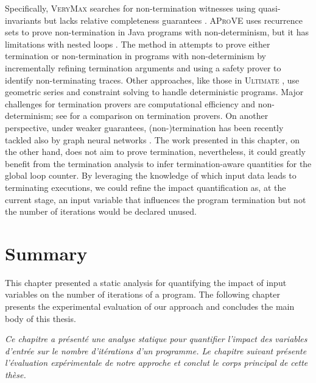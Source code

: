 Specifically, \textsc{VeryMax} \cite{Borralleras2017} searches for non-termination witnesses using quasi-invariants but lacks relative completeness guarantees \cite{Larraz2013}.
\textsc{AProVE} \cite{Giesl2017} uses recurrence sets to prove non-termination in Java programs with non-determinism, but it has limitations with nested loops .
The method in  attempts to prove either termination or non-termination in programs with non-determinism by incrementally refining termination arguments and using a safety prover to identify non-terminating traces.
Other approaches, like those in \textsc{Ultimate} \cite{Leike2018, Chen2018}, use geometric series and constraint solving to handle deterministic programs.
Major challenges for termination provers are computational efficiency and non-determinism; see  for a comparison on termination provers.
On another perspective, under weaker guarantees, (non-)termination has been recently tackled also by graph neural networks .
The work presented in this chapter, on the other hand, does not aim to prove termination, nevertheless, it could greatly benefit from the termination analysis to infer termination-aware quantities for the global loop counter.
By leveraging the knowledge of which input data leads to terminating executions, we could refine the impact quantification as, at the current stage, an input variable that influences the program termination but not the number of iterations would be declared unused.



\section{Summary}

This chapter presented a static analysis for quantifying the impact of input variables on the number of iterations of a program.
The following chapter presents the experimental evaluation of our approach and concludes the main body of this thesis.


\frenchdiv

\emph{Ce chapitre a présenté une analyse statique pour quantifier l'impact des variables d'entrée sur le nombre d'itérations d'un programme. Le chapitre suivant présente l'évaluation expérimentale de notre approche et conclut le corps principal de cette thèse.}
